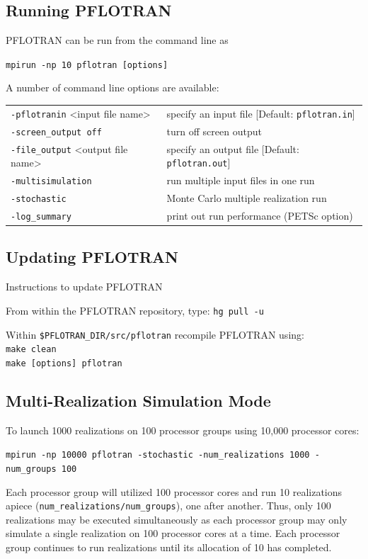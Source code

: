 \documentclass[12pt]{article}
\begin{document}
\subsection{Running PFLOTRAN}

PFLOTRAN can be run from the command line as

\verb|mpirun -np 10 pflotran [options]|

A number of command line options are available:

\begin{tabular}{ll}
{\tt -pflotranin} <input file name> & specify an input file [Default: {\tt pflotran.in}]\\
{\tt -screen\_output off} & turn off screen output\\
{\tt -file\_output} <output file name> & specify an output file [Default: {\tt pflotran.out}]\\
{\tt -multisimulation} & run multiple input files in one run\\
{\tt -stochastic} & Monte Carlo multiple realization run\\
{\tt -log\_summary} & print out run performance (PETSc option)
\end{tabular}

\subsection*{Updating PFLOTRAN}

Instructions to update PFLOTRAN

\noindent
From within the PFLOTRAN repository, type: {\tt hg pull -u}

\noindent
Within {\tt \$PFLOTRAN\_DIR/src/pflotran} recompile PFLOTRAN using:\\
{\tt make clean}\\
{\tt make [options] pflotran}

\subsection*{Multi-Realization Simulation Mode}

To launch 1000 realizations on 100 processor groups using 10,000 processor cores:

{\tt mpirun -np 10000 pflotran -stochastic -num\_realizations 1000 -num\_groups 100}

Each processor group will utilized 100 processor cores and run 10 realizations apiece \linebreak ({\tt num\_realizations/num\_groups}), one after another. Thus, only 100 realizations may be executed simultaneously as each processor group may only simulate a single realization on 100 processor cores at a time. Each processor group continues to run realizations until its allocation of 10 has completed.
\end{document}
